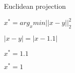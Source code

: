 \documentclass[11pt]{article}
\begin{document}
Euclidean projection

$x^* = arg_xmin||x-y||_2^2$

$|x-y|=|x-1.1|$

$x^*=1.1$

$x^*=1$
\end{document}
